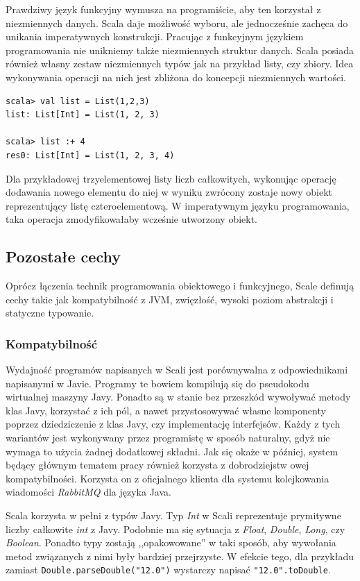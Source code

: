 \documentclass[brudnopis]{xmgr}
\begin{document}
Prawdziwy język funkcyjny wymusza na programiście, aby ten korzystał z niezmiennych danych. Scala daje możliwość wyboru, ale jednocześnie zachęca do unikania imperatywnych konstrukcji. Pracując z funkcyjnym językiem programowania nie unikniemy także niezmiennych struktur danych. Scala posiada również własny zestaw niezmiennych typów jak na przykład listy, czy zbiory. Idea wykonywania operacji na nich jest zbliżona do koncepcji niezmiennych wartości.

\begin{verbatim}
scala> val list = List(1,2,3)
list: List[Int] = List(1, 2, 3)

scala> list :+ 4
res0: List[Int] = List(1, 2, 3, 4)
\end{verbatim}

Dla przykładowej trzyelementowej listy liczb całkowitych, wykonując operację dodawania nowego elementu do niej w wyniku zwrócony zostaje nowy obiekt reprezentujący listę czteroelementową. W imperatywnym języku programowania, taka operacja zmodyfikowałaby wcześnie utworzony obiekt. 

\subsection{Pozostałe cechy}

Oprócz łączenia technik programowania obiektowego i funkcyjnego, Scale definują cechy takie jak kompatybilność z JVM, zwięzłość, wysoki poziom abstrakcji i statyczne typowanie. 

\subsubsection{Kompatybilność}

Wydajność programów napisanych w Scali jest porównywalna z odpowiednikami napisanymi w Javie. Programy te bowiem kompilują się do pseudokodu wirtualnej maszyny Javy. Ponadto są w stanie bez przeszkód wywoływać metody klas Javy, korzystać z ich pól, a nawet przystosowywać własne komponenty poprzez dziedziczenie z klas Javy, czy implementację interfejsów. Każdy z tych wariantów jest wykonywany przez programistę w sposób naturalny, gdyż nie wymaga to użycia żadnej dodatkowej składni. Jak się okaże w później, system będący głównym tematem pracy również korzysta z dobrodziejstw owej kompatybilności. Korzysta on z oficjalnego klienta dla systemu kolejkowania wiadomości \emph{RabbitMQ} dla języka Java.

Scala korzysta w pełni z typów Javy. Typ \emph{Int} w Scali reprezentuje prymitywne liczby całkowite \emph{int} z Javy. Podobnie ma się sytuacja z \emph{Float}, \emph{Double}, \emph{Long}, czy \emph{Boolean}. Ponadto typy zostają ,,opakowowane'' w taki sposób, aby wywołania metod związanych z nimi były bardziej przejrzyste. W efekcie tego, dla przykładu zamiast \texttt{Double.parseDouble("12.0")} wystarczy napisać \texttt{"12.0".toDouble}.
\end{document}
